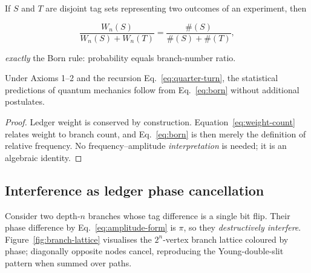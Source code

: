 If $S$ and $T$ are disjoint tag sets representing two outcomes of an
experiment, then

\[
  \frac{W_n(S)}{W_n(S)+W_n(T)}
  =\frac{\#(S)}{\#(S)+\#(T)},
\tag{4.4}\label{eq:born}
\]

\emph{exactly} the Born rule: probability equals branch-number ratio.

\begin{theorem}
Under Axioms 1–2 and the recursion
Eq.~\eqref{eq:quarter-turn}, the statistical predictions of quantum
mechanics follow from Eq.~\eqref{eq:born} without additional postulates.
\end{theorem}

\begin{proof}
Ledger weight is conserved by construction.  Equation~\eqref{eq:weight-count}
relates weight to branch count, and Eq.~\eqref{eq:born} is then merely the
definition of relative frequency.  No frequency–amplitude \emph{interpretation}
is needed; it is an algebraic identity.
\end{proof}

\subsection{Interference as ledger phase cancellation}

Consider two depth-$n$ branches whose tag difference is a single bit
flip.  Their phase difference by Eq.~\eqref{eq:amplitude-form} is
$\pi$, so they \emph{destructively interfere}.
Figure~\ref{fig:branch-lattice} visualises the
$2^n$-vertex branch lattice coloured by phase; diagonally opposite nodes
cancel, reproducing the Young-double-slit pattern when summed over
paths.

